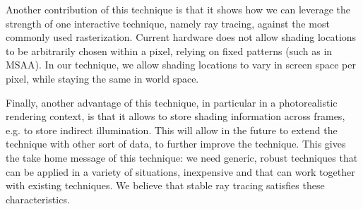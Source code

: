 Another contribution of this technique is that it shows how we can leverage the strength of one interactive technique, namely ray tracing, against the most commonly used rasterization. Current hardware does not allow shading locations to be arbitrarily chosen within a pixel, relying on fixed patterns (such as in MSAA). In our technique, we allow shading locations to vary in screen space per pixel, while staying the same in world space. 

Finally, another advantage of this technique, in particular in a photorealistic rendering context, is that it allows to store shading information across frames, e.g. to store indirect illumination. This will allow in the future to extend the technique with other sort of data, to further improve the technique. This gives the take home message of this technique: we need generic, robust techniques that can be applied in a variety of situations, inexpensive and that can work together with existing techniques. We believe that stable ray tracing satisfies these characteristics. 


